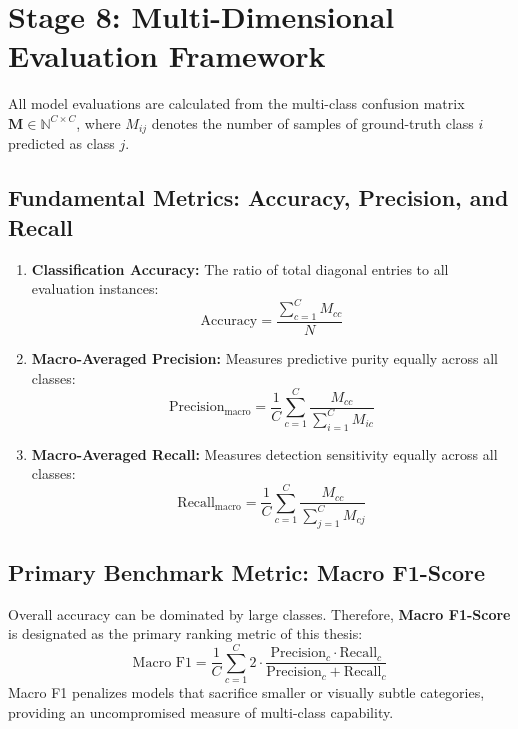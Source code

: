\documentclass[a4paper, 11pt]{article}
\begin{document}
\section{Stage 8: Multi-Dimensional Evaluation Framework}

All model evaluations are calculated from the multi-class confusion matrix $\mathbf{M} \in \mathbb{N}^{C \times C}$, where $M_{ij}$ denotes the number of samples of ground-truth class $i$ predicted as class $j$.

\subsection{Fundamental Metrics: Accuracy, Precision, and Recall}
\begin{enumerate}
    \item \textbf{Classification Accuracy:} The ratio of total diagonal entries to all evaluation instances:
    \begin{equation}
        \text{Accuracy} = \frac{\sum_{c=1}^C M_{cc}}{N}
    \end{equation}
    \item \textbf{Macro-Averaged Precision:} Measures predictive purity equally across all classes:
    \begin{equation}
        \text{Precision}_{\text{macro}} = \frac{1}{C}\sum_{c=1}^C \frac{M_{cc}}{\sum_{i=1}^C M_{ic}}
    \end{equation}
    \item \textbf{Macro-Averaged Recall:} Measures detection sensitivity equally across all classes:
    \begin{equation}
        \text{Recall}_{\text{macro}} = \frac{1}{C}\sum_{c=1}^C \frac{M_{cc}}{\sum_{j=1}^C M_{cj}}
    \end{equation}
\end{enumerate}

\subsection{Primary Benchmark Metric: Macro F1-Score}
Overall accuracy can be dominated by large classes. Therefore, \textbf{Macro F1-Score} is designated as the primary ranking metric of this thesis:
\begin{equation}
    \text{Macro F1} = \frac{1}{C}\sum_{c=1}^C 2 \cdot \frac{\text{Precision}_c \cdot \text{Recall}_c}{\text{Precision}_c + \text{Recall}_c}
\end{equation}
Macro F1 penalizes models that sacrifice smaller or visually subtle categories, providing an uncompromised measure of multi-class capability.
\end{document}
